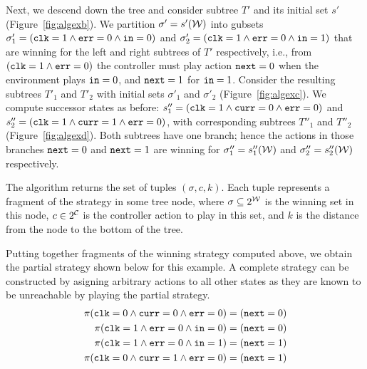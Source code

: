 Next, we descend down the tree and consider subtree $T'$ and its initial set $s'$ (Figure~\ref{fig:algexb}).  We partition $\sigma' = s'(\mathcal{W})$ into gubsets $\sigma_1' = (\texttt{clk} = 1 \land \texttt{err} = 0 \land \texttt{in} = 0)$ and $\sigma_2' = (\texttt{clk} = 1 \land \texttt{err} = 0 \land \texttt{in} = 1)$ that are winning for the left and right subtrees of $T'$ respectively, i.e., from $(\texttt{clk} = 1 \land \texttt{err} = 0)$ the controller must play action $\texttt{next} = 0$ when the environment plays $\texttt{in} = 0$, and $\texttt{next} = 1$ for $\texttt{in} = 1$.  Consider the resulting subtrees $T'_1$ and $T'_2$ with initial sets $\sigma'_1$ and $\sigma'_2$ (Figure~\ref{fig:algexc}).  We compute successor states as before: $s''_1 = (\texttt{clk} = 1 \land \texttt{curr} = 0 \land \texttt{err} = 0)$ and $s''_2 = (\texttt{clk} = 1 \land \texttt{curr} = 1 \land \texttt{err} = 0)$, with corresponding subtrees $T''_1$ and $T''_2$ (Figure~\ref{fig:algexd}).  Both subtrees have one branch; hence the actions in those branches $\texttt{next} = 0$ and $\texttt{next} = 1$ are winning for $\sigma''_1 = s''_1(\mathcal{W})$ and $\sigma''_2 = s''_2(\mathcal{W})$ respectively.

The algorithm returns the set of tuples $(\sigma, c, k)$.  Each tuple represents a fragment of the strategy in some tree node, where $\sigma \subseteq 2^{\mathcal{W}}$ is the winning set in this node, $c \in 2^{\mathcal{C}}$ is the controller action to play in this set, and $k$ is the distance from the node to the bottom of the tree.

Putting together fragments of the winning strategy computed above, we obtain the partial strategy shown below for this example. A complete strategy can be constructed by asigning arbitrary actions to all other states as they are known to be unreachable by playing the partial strategy.
\begin{align*}
    \pi(\texttt{clk} = 0 \land \texttt{curr} = 0 \land \texttt{err} = 0) &= (\texttt{next} = 0) \\
    \pi(\texttt{clk} = 1 \land \texttt{err} = 0 \land \texttt{in} = 0) &= (\texttt{next} = 0) \\
    \pi(\texttt{clk} = 1 \land \texttt{err} = 0 \land \texttt{in} = 1) &= (\texttt{next} = 1) \\
    \pi(\texttt{clk} = 0 \land \texttt{curr} = 1 \land \texttt{err} = 0) &= (\texttt{next} = 1)
\end{align*}





